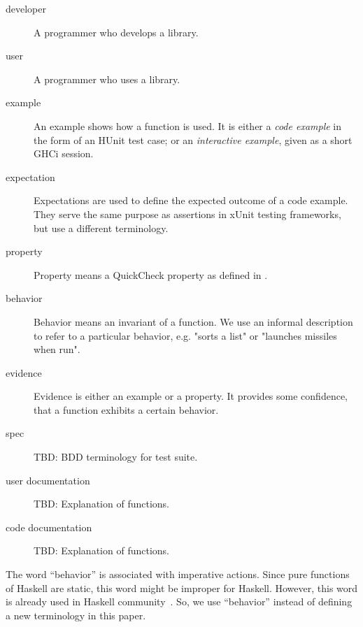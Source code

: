 \documentclass[preprint]{sigplanconf}
\begin{document}
\begin{description}

\item[developer]
    A programmer who develops a library.

\item[user]
    A programmer who uses a library.

\item[example]
    An example shows how a function is used.  It is either a \emph{code
    example} in the form of an HUnit test case; or an \emph{interactive
    example}, given as a short GHCi session.

\item[expectation]
    Expectations are used to define the expected outcome of a code
    example.  They serve the same purpose as assertions in xUnit
    testing frameworks, but use a different terminology.

\item[property]
    Property means a QuickCheck property as defined in
    \cite{quickcheck}.

\item[behavior]
    Behavior means an invariant of a function.  We use an informal description
    to refer to a particular behavior, e.g.  "sorts a list" or "launches
    missiles when run".

\item[evidence]
    Evidence is either an example or a property.  It provides some confidence,
    that a function exhibits a certain behavior.

\item[spec]
    TBD: BDD terminology for test suite.

\item[user documentation]
    TBD: Explanation of functions.
\item[code documentation]
    TBD: Explanation of functions.

\end{description}

The word ``behavior'' is associated with imperative actions.
Since pure functions of Haskell are static,
this word might be improper for Haskell.
However, this word is already used in Haskell community~\cite{typeclassopedia}.
So, we use ``behavior'' instead of defining a new terminology in this paper.

\end{document}
